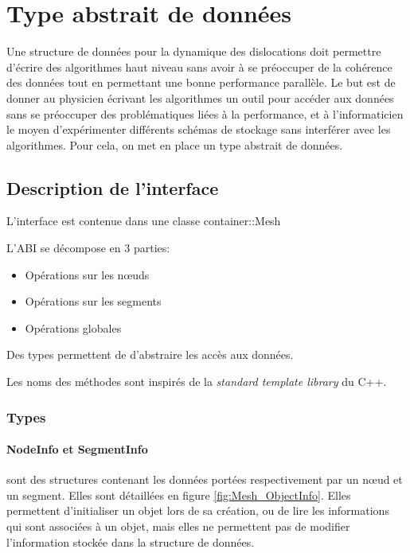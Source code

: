 \section{Type abstrait de données}

Une structure de données pour la dynamique des dislocations doit permettre d'écrire des algorithmes haut niveau sans avoir à se préoccuper de la cohérence des données tout en permettant une bonne performance parallèle. Le but est de donner au physicien écrivant les algorithmes un outil pour accéder aux données sans se préoccuper des problématiques liées à la performance, et à l'informaticien le moyen d'expérimenter différents schémas de stockage sans interférer avec les algorithmes. Pour cela, on met en place un type abstrait de données.

\subsection{ Description de l'interface }

L'interface est contenue dans une classe container::Mesh

L'ABI se décompose en 3 parties:
\begin{itemize}
	\item Opérations sur les nœuds
	\item Opérations sur les segments
	\item Opérations globales
\end{itemize}

Des types permettent de d'abstraire les accès aux données.

Les noms des méthodes sont inspirés de la \textit{standard template library} du C++.

\subsubsection{Types}

\paragraph{NodeInfo et SegmentInfo} sont des structures contenant les données portées respectivement par un nœud et un segment. Elles sont détaillées en figure \ref{fig:Mesh_ObjectInfo}. Elles permettent d'initialiser un objet lors de sa création, ou de lire les informations qui sont associées à un objet, mais elles ne permettent pas de modifier l'information stockée dans la structure de données. 

